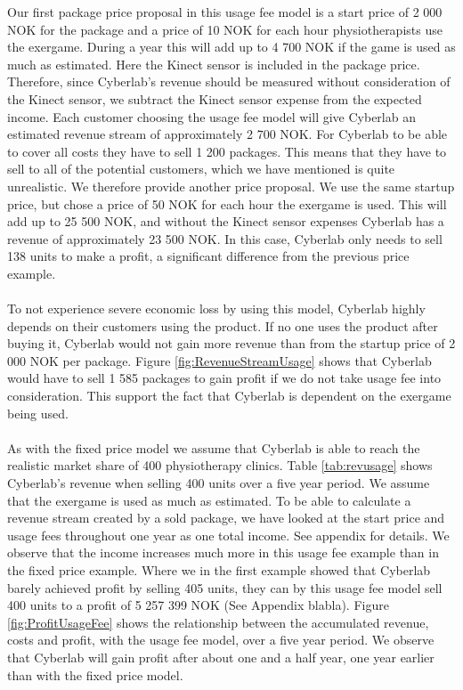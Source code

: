 Our first package price proposal in this usage fee model is a start price of 2 000 NOK for the package and a price of 10 NOK for each hour physiotherapists use the exergame. During a year this will add up to 4 700 NOK if the game is used as much as estimated. Here the Kinect sensor is included in the package price. Therefore, since Cyberlab’s revenue should be measured without consideration of the Kinect sensor, we subtract the Kinect sensor expense from the expected income. Each customer choosing the usage fee model will give Cyberlab an estimated revenue stream of approximately 2 700 NOK. For Cyberlab to be able to cover all costs they have to sell 1 200 packages. This means that they have to sell to all of the potential customers, which we have mentioned is quite unrealistic. We therefore provide another price proposal. We use the same startup price, but chose a price of 50 NOK for each hour the exergame is used. This will add up to 25 500 NOK, and without the Kinect sensor expenses Cyberlab has a revenue of approximately 23 500 NOK. In this case, Cyberlab only needs to sell 138 units to make a profit, a significant difference from the previous price example. \\ \\
To not experience severe economic loss by using this model, Cyberlab highly depends on their customers using the product. If no one uses the product after buying it, Cyberlab would not gain more revenue than from the startup price of 2 000 NOK per package. Figure \ref{fig:RevenueStreamUsage} shows that Cyberlab would have to sell 1 585 packages to gain profit if we do not take usage fee into consideration. This support the fact that Cyberlab is dependent on the exergame being used. \\ \\
As with the fixed price model we assume that Cyberlab is able to reach the realistic market share of 400 physiotherapy clinics. Table \ref{tab:revusage} shows Cyberlab's revenue when selling 400 units over a five year period. We assume that the exergame is used as much as estimated. To be able to calculate a revenue stream created by a sold package, we have looked at the start price and usage fees throughout one year as one total income. See appendix for details. We observe that the income increases much more in this usage fee example than in the fixed price example. Where we in the first example showed that Cyberlab barely achieved profit by selling 405 units, they can by this usage fee model sell 400 units to a profit of 5 257 399 NOK (See Appendix blabla). Figure \ref{fig:ProfitUsageFee} shows the relationship between the accumulated revenue, costs and profit, with the usage fee model, over a five year period. We observe that Cyberlab will gain profit after about one and a half year, one year earlier than with the fixed price model. \\ \\

